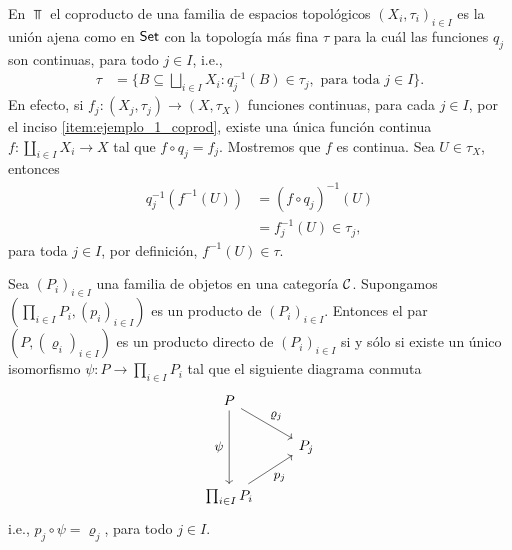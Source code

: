 \begin{ejemplo}
\begin{enumerate}[label=(\arabic*)]
    En $\Top$ el coproducto de una familia de espacios topológicos $(X_i,\tau_i)_{i\in I}$ es la unión ajena como en $\textsf{Set}$ con la topología más fina $\tau$ para la cuál las funciones $q_j$ son continuas, para todo $j\in I$, i.e.,
    \begin{align*}
        \tau&=\{B\subseteq\textstyle\bigsqcup_{i\in I} X_i:q_j^{-1}(B)\in\tau_j, \text{ para toda } j\in I\}.
    \end{align*}
    En efecto, si $f_j:(X_j,\tau_j)\to (X,\tau_X)$ funciones continuas, para cada $j\in I$, por el inciso \ref{item:ejemplo_1_coprod}, existe una única función continua $f:\coprod_{i\in I}X_i\to X$ tal que $f\circ q_j=f_j$. Mostremos que $f$ es continua.
    Sea $U\in\tau_X$, entonces 
    \begin{align*}
        q_j^{-1}(f^{-1}(U))&=
        (f\circ q_j)^{-1}(U)\\
        &=f_j^{-1}(U)\in \tau_j,
    \end{align*}
    para toda $j\in I$, por definición, $f^{-1}(U)\in \tau$.
    \end{enumerate}
\end{ejemplo}
\begin{prop}
\label{unicidad producto}
    Sea $(P_i)_{i\in I}$ una familia de objetos en una categoría $\mathcal{C}$. Supongamos $(\prod_{i\in I}P_i,(p_{i})_{i\in I})$ es un producto de $(P_i)_{i\in I}$.
    Entonces el par $(P,(\varrho_i)_{i\in I})$
    es un producto directo de $(P_i)_{i\in I}$ si y s\'olo si existe un único isomorfismo $\psi: P\to \prod_{i\in I}P_i$ tal que el siguiente diagrama conmuta
    \[
\begin{tikzcd}[every label/.append style = {font = \small},column sep=normal, row sep=normal]
   P \arrow[dd,"\psi"'{xshift=-1.75pt}]  \arrow[dr,"\varrho_j"] \\
   & P_j  \\
   \prod_{i\in I}P_i  \arrow[ur,"p_j"']
\end{tikzcd}
\] 
i.e., $p_j\circ\psi=\varrho_j$, para todo $j\in I.$ 
\end{prop}
